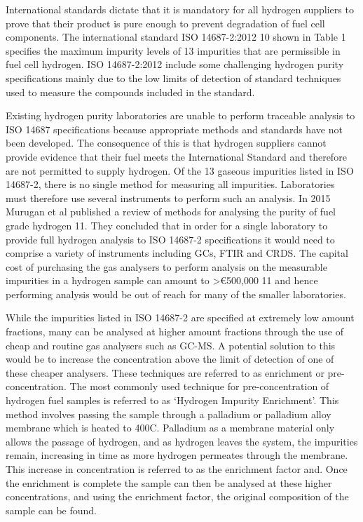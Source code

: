 International standards dictate that it is mandatory for all hydrogen suppliers to prove that their product is pure enough to prevent degradation of fuel cell components. The international standard ISO 14687-2:2012 10 shown in Table 1 specifies the maximum impurity levels of 13 impurities that are permissible in fuel cell hydrogen. ISO 14687-2:2012 include some challenging hydrogen purity specifications mainly due to the low limits of detection of standard techniques used to measure the compounds included in the standard. 

Existing hydrogen purity laboratories are unable to perform traceable analysis to ISO 14687 specifications because appropriate methods and standards have not been developed. The consequence of this is that hydrogen suppliers cannot provide evidence that their fuel meets the International Standard and therefore are not permitted to supply hydrogen. Of the 13 gaseous impurities listed in ISO 14687-2, there is no single method for measuring all impurities. Laboratories must therefore use several instruments to perform such an analysis.  In 2015 Murugan et al published a review of methods for analysing the purity of fuel grade hydrogen 11. They concluded that in order for a single laboratory to provide full hydrogen analysis to ISO 14687-2 specifications it would need to comprise a variety of instruments including GCs, FTIR and CRDS. The capital cost of purchasing the gas analysers to perform analysis on the measurable impurities in a hydrogen sample can amount to >€500,000 11 and hence performing analysis would be out of reach for many of the smaller laboratories. 

While the impurities listed in ISO 14687-2 are specified at extremely low amount fractions, many can be analysed at higher amount fractions through the use of cheap and routine gas analysers such as GC-MS. A potential solution to this would be to increase the concentration above the limit of detection of one of these cheaper analysers. These techniques are referred to as enrichment or pre-concentration. The most commonly used technique for pre-concentration of hydrogen fuel samples is referred to as ‘Hydrogen Impurity Enrichment’.  This method involves passing the sample through a palladium or palladium alloy membrane which is heated to 400\textdegree C. Palladium as a membrane material only allows the passage of hydrogen, and as hydrogen leaves the system, the impurities remain, increasing in time as more hydrogen permeates through the membrane.  This increase in concentration is referred to as the enrichment factor and. Once the enrichment is complete the sample can then be analysed at these higher concentrations, and using the enrichment factor, the original composition of the sample can be found. 

